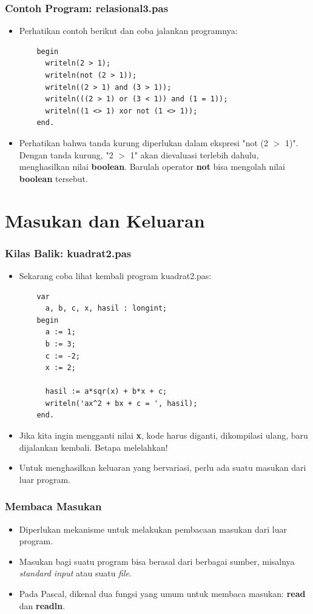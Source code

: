 \documentclass{beamer}
\begin{document}
\begin{frame}[fragile]
\frametitle{Contoh Program: relasional3.pas}
\begin{itemize}
  \item Perhatikan contoh berikut dan coba jalankan programnya:
  \begin{lstlisting}
    begin
      writeln(2 > 1);
      writeln(not (2 > 1));
      writeln((2 > 1) and (3 > 1));
      writeln(((2 > 1) or (3 < 1)) and (1 = 1));
      writeln((1 <> 1) xor not (1 <> 1));
    end.
  \end{lstlisting}
  \item Perhatikan bahwa tanda kurung diperlukan dalam ekspresi "not (2 $>$ 1)". Dengan tanda kurung, "2 $>$ 1" akan dievaluasi terlebih dahulu, menghasilkan nilai \textbf{boolean}. Barulah operator \textbf{not} bisa mengolah nilai \textbf{boolean} tersebut.
\end{itemize}
\end{frame}

\section{Masukan dan Keluaran}
\frame{\sectionpage}

\begin{frame}[fragile]
\frametitle{Kilas Balik: kuadrat2.pas}
\begin{itemize}
  \item Sekarang coba lihat kembali program kuadrat2.pas:
  \begin{lstlisting}
    var
      a, b, c, x, hasil : longint;
    begin
      a := 1;
      b := 3;
      c := -2;
      x := 2;

      hasil := a*sqr(x) + b*x + c;
      writeln('ax^2 + bx + c = ', hasil);
    end.
  \end{lstlisting}
  \item Jika kita ingin mengganti nilai \textbf{x}, kode harus diganti, dikompilasi ulang, baru dijalankan kembali. Betapa melelahkan!
  \item Untuk menghasilkan keluaran yang bervariasi, perlu ada \newline suatu masukan dari luar program.
\end{itemize}
\end{frame}

\begin{frame}
\frametitle{Membaca Masukan}
\begin{itemize}
  \item Diperlukan mekanisme untuk melakukan pembacaan masukan dari luar program.
  \item Masukan bagi suatu program bisa berasal dari berbagai sumber, misalnya \textit{standard input} atau suatu \textit{file}.
  \item Pada Pascal, dikenal dua fungsi yang umum untuk membaca masukan: \alert{\textbf{read}} dan \alert{\textbf{readln}}.
\end{itemize}
\end{frame}
\end{document}
